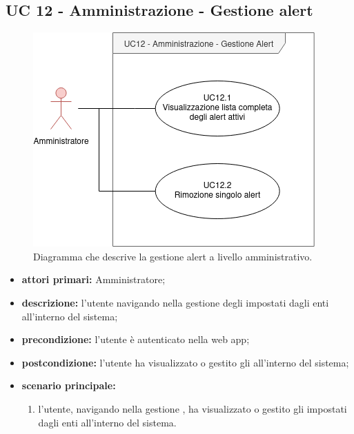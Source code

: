 	\subsection{UC 12 - Amministrazione - Gestione alert}

		\begin{figure}[H]
			\centering
			\includegraphics[scale=0.60]{res/images/uc12}
			\caption{Diagramma che descrive la gestione alert a livello amministrativo.}
		\end{figure}

		\begin{itemize}
			\item \textbf{attori primari:} Amministratore;
			\item \textbf{descrizione:} l'utente navigando nella gestione degli  impostati dagli enti all'interno del sistema;
			\item \textbf{precondizione:} l'utente è autenticato nella web app;
			\item \textbf{postcondizione:} l'utente ha visualizzato o gestito gli  all'interno del sistema;
			\item \textbf{scenario principale:}
			\begin{enumerate}
				\item{l'utente, navigando nella gestione , ha visualizzato o gestito gli  impostati dagli enti all'interno del sistema.}
			\end{enumerate}	
		\end{itemize}

